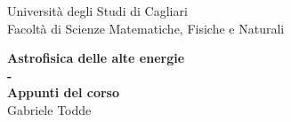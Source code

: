 


\begin{titlepage}

\begin{center}
    \LARGE{Università degli Studi di Cagliari}
    \vspace{5mm}
    \\ \large{Facoltà di Scienze Matematiche, Fisiche e Naturali}
    \vspace{5mm}
\end{center}

\vspace{15mm}
\begin{center}
    {\LARGE{\bf Astrofisica delle alte energie
    \\ - 
    \vspace{4mm}\\Appunti del corso }}\\
    \vspace{60mm}
    {\LARGE{ Gabriele Todde}}
    
    

\end{center}
\vspace{30mm}


\vspace{30mm}
\hrulefill
\\

\end{titlepage}

